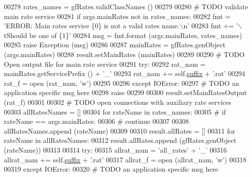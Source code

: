 \begin{DoxyCode}
00278         rates\_names = gfRates.validClassNames ()
00279 
00280         \textcolor{comment}{# TODO validate main rate service}
00281         \textcolor{keywordflow}{if} args.mainRates \textcolor{keywordflow}{not} \textcolor{keywordflow}{in} rates\_names:
00282             fmt  = \textcolor{stringliteral}{'ERROR: Main rates service \{0\} is not a valid rates name.\(\backslash\)n'}
00283             fmt += \textcolor{stringliteral}{'\(\backslash\)tShould be one of \{1\}'}
00284             msg = fmt.format (args.mainRates, rates\_names)
00285             \textcolor{keywordflow}{raise} Exception (msg)
00286 
00287         mainRates = gfRates.genObject (args.mainRates)
00288         result.setMainRates (mainRates)
00289         
00290         \textcolor{comment}{# TODO Open output file for main rate service}
00291         \textcolor{keywordflow}{try}:
00292             rat\_nam  =  mainRates.getServicePrefix () + \textcolor{stringliteral}{'\_'}
00293             rat\_nam +=  self.\hyperlink{classe2e_1_1_application_a4d824ad36b051d2d629edb314385df0d}{suffix} + \textcolor{stringliteral}{'.rat'}
00294             rat\_f = open (rat\_nam, \textcolor{stringliteral}{'w'})
00295             
00296         \textcolor{keywordflow}{except} IOError:
00297             \textcolor{comment}{# TODO an application specific msg here}
00298             \textcolor{keywordflow}{raise}        
00299 
00300         result.setMainRatesOutput (rat\_f)
00301             
00302         \textcolor{comment}{# TODO open connections with auxiliary rate services}
00303         allRatesNames = []        
00304         \textcolor{keywordflow}{for} rateName \textcolor{keywordflow}{in} rates\_names:
00305 \textcolor{comment}{#            if rateName == args.mainRates:}
00306 \textcolor{comment}{#                continue }
00307             
00308             allRatesNames.append (rateName)
00309 
00310         result.allRates = []            
00311         \textcolor{keywordflow}{for} rateName \textcolor{keywordflow}{in} allRatesNames:
00312             result.allRates.append (gfRates.genObject (rateName))
00313             
00314         \textcolor{keywordflow}{try}:
00315             allrat\_nam  =  \textcolor{stringliteral}{'all\_rates'} + \textcolor{stringliteral}{'\_'}
00316             allrat\_nam +=  self.\hyperlink{classe2e_1_1_application_a4d824ad36b051d2d629edb314385df0d}{suffix} + \textcolor{stringliteral}{'.rat'}
00317             allrat\_f = open (allrat\_nam, \textcolor{stringliteral}{'w'})
00318             
00319         \textcolor{keywordflow}{except} IOError:
00320             \textcolor{comment}{# TODO an application specific msg here}

\end{DoxyCode}
